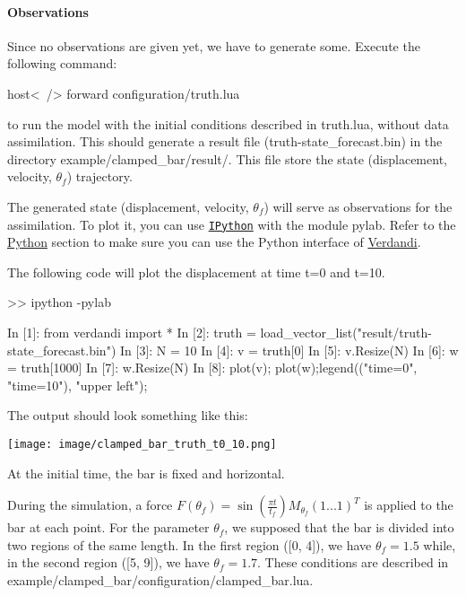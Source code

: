 \documentclass{tufte-book}
\begin{document}
  \hypertarget{notation_observations}{}\paragraph{\-Observations}\label{notation_observations}

\-Since no observations are given yet, we have to generate some. \-Execute the following command\-:
\begin{frame_bash}
host<~/> forward configuration/truth.lua
\end{frame_bash}
  to run the model with the initial conditions described in {\ttfamily truth.\-lua}, without data assimilation. \-This should generate a result file ({\ttfamily truth-\/state\-\_\-forecast.\-bin}) in the directory {\ttfamily example/clamped\-\_\-bar/result/}. \-This file store the state (displacement, velocity, $ \theta_{f} $) trajectory.

\-The generated state (displacement, velocity, $ \theta_{f} $) will serve as observations for the assimilation. \-To plot it, you can use \href{http://ipython.scipy.org/}{\tt \-I\-Python} with the module pylab. \-Refer to the \hyperlink{python}{\-Python} section to make sure you can use the \-Python interface of \hyperlink{namespace_verdandi}{\-Verdandi}.

\-The following code will plot the displacement at time t=0 and t=10.

\begin{frame_python}
>> ipython -pylab

In  [1]: from verdandi import *
In  [2]: truth = load_vector_list("result/truth-state_forecast.bin")
In  [3]: N = 10
In  [4]: v = truth[0]
In  [5]: v.Resize(N)
In  [6]: w = truth[1000]
In  [7]: w.Resize(N)
In  [8]: plot(v); plot(w);legend(("time=0", "time=10"), "upper left");

\end{frame_python}


\-The output should look something like this\-:

\texttt{[image: image/clamped\_bar\_truth\_t0\_10.png]}

\-At the initial time, the bar is fixed and horizontal.

\-During the simulation, a force $F(\theta_f) = \sin(\frac{\pi t}{t_f}) M_{\theta_f} (1 ... 1)^T$ is applied to the bar at each point. \-For the parameter $ \theta_f $, we supposed that the bar is divided into two regions of the same length. \-In the first region (\mbox{[}0, 4\mbox{]}), we have $ \theta_f = 1.5 $ while, in the second region (\mbox{[}5, 9\mbox{]}), we have $ \theta_f = 1.7$. \-These conditions are described in {\ttfamily example/clamped\-\_\-bar/configuration/clamped\-\_\-bar.\-lua}.
\end{document}
